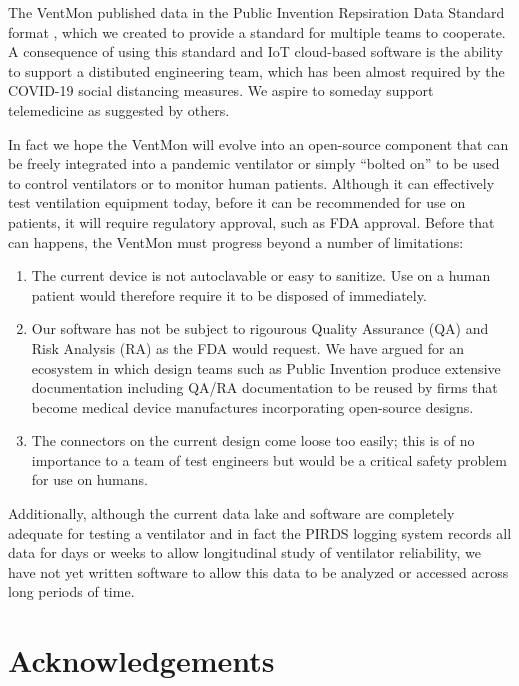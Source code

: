 \documentclass[11pt, letterpaper]{article}
\begin{document}
The VentMon published data in the Public Invention Repsiration Data Standard format \cite{PIRDS}, which we created to provide a standard for multiple teams
to cooperate. A consequence of using this standard and IoT cloud-based software is the ability to support a distibuted engineering team,
which has been almost required by the COVID-19 social distancing measures. We aspire to someday support telemedicine as suggested by others\cite{rehm2018development}.

In fact we hope the VentMon will evolve into an open-source component that can be freely
integrated into a pandemic ventilator or simply ``bolted on'' to be used
to control ventilators or to monitor human patients. Although it can effectively test ventilation equipment today, before it can be recommended for use
on patients, it will require regulatory approval, such as FDA approval. Before that can happens, the VentMon must progress beyond a number of limitations:
\begin{enumerate}
\item The current device is not autoclavable or easy to sanitize.
  Use on a human patient would therefore require it to be disposed of immediately.
\item Our software has not be subject to rigourous Quality Assurance (QA) and Risk Analysis (RA)
  as the FDA would request. We have argued\cite{ecosystem}
  for an ecosystem in which design teams such as Public Invention produce extensive documentation including  QA/RA documentation to be reused by
  firms that become medical device manufactures incorporating open-source designs.
  \item The connectors on the current design come loose too easily; this is of no importance to a team of test engineers but would be a critical safety problem for use on humans.
\end{enumerate}

Additionally, although the current data lake and software are completely adequate for testing a ventilator and in fact the PIRDS logging system records all
data for days or weeks to allow longitudinal study of ventilator reliability, we have not yet written software to allow this data to be analyzed or accessed across
long periods of time.



\section{Acknowledgements}
\end{document}
